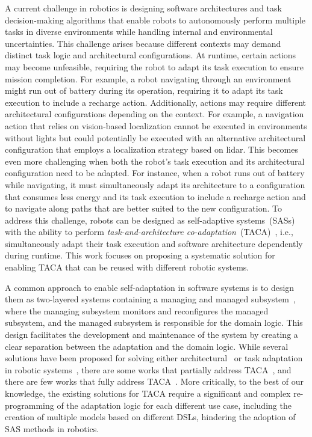 A current challenge in robotics is designing software architectures and task decision-making algorithms that enable robots to autonomously perform multiple tasks in diverse environments while handling internal and environmental uncertainties. This challenge arises because different contexts may demand distinct task logic and architectural configurations. At runtime, certain actions may become unfeasible, requiring the robot to adapt its task execution to ensure mission completion. For example, a robot navigating through an environment might run out of battery during its operation, requiring it to adapt its task execution to include a recharge action. Additionally, actions may require different architectural configurations depending on the context. For example, a navigation action that relies on vision-based localization cannot be executed in environments without lights but could potentially be executed with an alternative architectural configuration that employs a localization strategy based on lidar. This becomes even more challenging when both the robot’s task execution and its architectural configuration need to be adapted. For instance, when a robot runs out of battery while navigating, it must simultaneously adapt its architecture to a configuration that consumes less energy and its task execution to include a recharge action and to navigate along paths that are better suited to the new configuration. To address this challenge, robots can be designed as self-adaptive systems~(SASs) with the ability to perform \emph{task-and-architecture co-adaptation}~(TACA)~\citep{ CAMARASoftwareArchitectureTask2020}, i.e., simultaneously adapt their task execution and software architecture dependently during runtime. This work focuses on proposing a systematic solution for enabling TACA that can be reused with different robotic systems.


A common approach to enable self-adaptation in software systems is to design them as two-layered systems containing a managing and managed subsystem~\citep{weyns2020introduction}, where the managing subsystem monitors and reconfigures the managed subsystem, and the managed subsystem is responsible for the domain logic. This design facilitates the development and maintenance of the system by creating a clear separation between the adaptation and the domain logic. While several solutions have been proposed for solving either architectural~\citep{ALBERTS2025112258} or task adaptation in robotic systems~\citep{carreno2021situation, hamilton2022towards}, there are some works that partially address TACA~\mbox{\citep{park2012task, runtime_variability_lotz, rra_nico, temoto}}, and there are few works that fully address TACA~\citep{braberman2018extended, CAMARASoftwareArchitectureTask2020}.
More critically, to the best of our knowledge, the existing solutions for TACA  require a significant and complex re-programming of the adaptation logic for each different use case, including the creation of multiple models based on different DSLs, hindering the adoption of SAS methods in robotics.

